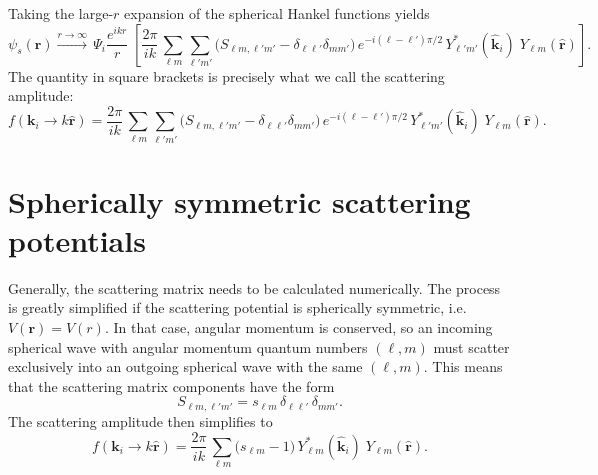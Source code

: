 \documentclass[pra,12pt]{revtex4}
\begin{document}
Taking the large-$r$ expansion of the spherical Hankel functions yields
$$\psi_s(\mathbf{r}) \overset{r\rightarrow\infty}{\longrightarrow} \, \Psi_i \frac{e^{ikr}}{r} \; \left[ \frac{2 \pi}{ik}\, \sum_{\ell m} \sum_{\ell' m'} \Big(S_{\ell m, \ell' m'} - \delta_{\ell \ell'}\delta_{mm'}\Big) \, e^{-i(\ell-\ell')\pi/2} \, Y_{\ell' m'}^*(\hat{\mathbf{k}}_i)\; Y_{\ell m}(\hat{\mathbf{r}})\right].$$
The quantity in square brackets is precisely what we call the
scattering amplitude:
$$f(\mathbf{k}_i \rightarrow k\hat{\mathbf{r}}) =  \frac{2 \pi}{ik}\, \sum_{\ell m} \sum_{\ell' m'} \Big(S_{\ell m, \ell' m'} - \delta_{\ell \ell'}\delta_{mm'}\Big) \, e^{-i(\ell-\ell')\pi/2} \, Y_{\ell' m'}^*(\hat{\mathbf{k}}_i)\; Y_{\ell m}(\hat{\mathbf{r}}).$$

\section{Spherically symmetric scattering potentials}

Generally, the scattering matrix needs to be calculated numerically.
The process is greatly simplified if the scattering potential is
spherically symmetric, i.e.~$V(\mathbf{r}) = V(r)$.  In that case,
angular momentum is conserved, so an incoming spherical wave with
angular momentum quantum numbers $(\ell,m)$ must scatter exclusively
into an outgoing spherical wave with the same $(\ell,m)$.  This means
that the scattering matrix components have the form
$$S_{\ell m, \ell'm'} = s_{\ell m}\, \delta_{\ell\ell'}\, \delta_{mm'}.$$
The scattering amplitude then simplifies to
$$f(\mathbf{k}_i \rightarrow k\hat{\mathbf{r}}) =  \frac{2 \pi}{ik}\, \sum_{\ell m} \Big(s_{\ell m} - 1\Big) \, Y_{\ell m}^*(\hat{\mathbf{k}}_i)\; Y_{\ell m}(\hat{\mathbf{r}}).$$
\end{document}
